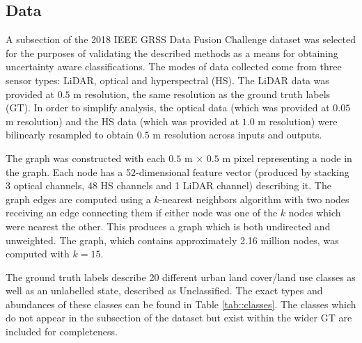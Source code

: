 \documentclass[
twocolumn,
]{ceurart}
\begin{document}
\subsection{Data}
A subsection of the 2018 IEEE GRSS Data Fusion Challenge dataset was selected for the purposes of validating the described methods as a means for obtaining uncertainty aware classifications.
The modes of data collected come from three sensor types: LiDAR, optical and hyperspectral (HS).
The LiDAR data was provided at $0.5$ m resolution, the same resolution as the ground truth labels (GT).
In order to simplify analysis, the optical data (which was provided at $0.05$ m resolution) and the HS data (which was provided at $1.0$ m resolution) were bilinearly resampled to obtain $0.5$ m resolution across inputs and outputs.

The graph was constructed with each $0.5$ m $\times$ $0.5$ m pixel representing a node in the graph.
Each node has a 52-dimensional feature vector (produced by stacking 3 optical channels, 48 HS channels and 1 LiDAR channel) describing it.
The graph edges are computed using a $k$-nearest neighbors algorithm with two nodes receiving an edge connecting them if either node was one of the $k$ nodes which were nearest the other.
This produces a graph which is both undirected and unweighted.
The graph, which contains approximately 2.16 million nodes, was computed with $k=15$.

The ground truth labels describe 20 different urban land cover/land use classes as well as an unlabelled state, described as Unclassified.
The exact types and abundances of these classes can be found in Table \ref{tab::classes}.
The classes which do not appear in the subsection of the dataset but exist within the wider GT are included for completeness.
\end{document}
